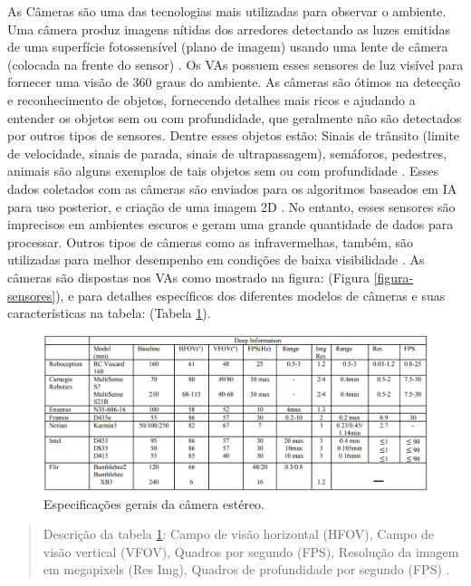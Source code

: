 As Câmeras são uma das tecnologias mais utilizadas para observar o ambiente. Uma câmera produz imagens nítidas dos arredores detectando as luzes emitidas de uma superfície fotossensível (plano de imagem) usando uma lente de câmera (colocada na frente do sensor) \cite{sensors}. Os VAs possuem esses sensores de luz visível para fornecer uma visão de 360 graus do ambiente. As câmeras são ótimos na detecção e reconhecimento de objetos, fornecendo detalhes mais ricos e ajudando a entender os objetos sem ou com profundidade, que geralmente não são detectados por outros tipos de sensores. Dentre esses objetos estão: Sinais de trânsito (limite de velocidade, sinais de parada, sinais de ultrapassagem), semáforos, pedestres, animais são alguns exemplos de tais objetos sem ou com profundidade \cite{sensors-yet}. Esses dados coletados com as câmeras são enviados para os algoritmos baseados em IA para uso posterior, e criação de uma imagem 2D \cite{aplicacao2}. 
No entanto, esses sensores são imprecisos em ambientes escuros e geram uma grande quantidade de dados para processar. Outros tipos de câmeras como as infravermelhas, também, são utilizadas para melhor desempenho em condições de baixa visibilidade \cite{review-auto}. As câmeras são dispostas nos VAs como mostrado na figura: (Figura \ref{figura-sensores}), e para detalhes específicos dos diferentes modelos de câmeras e suas características na tabela: (Tabela \ref{tabela-camera}).

\begin{figure}[H]
\centering
\includegraphics[width=\textwidth]{Figures/camera-table.png}
\caption{Especificações gerais da câmera estéreo.}
\label{tabela-camera}
\end{figure}
\begin{quote}
Descrição da tabela \ref{tabela-camera}: Campo de visão horizontal (HFOV), Campo de visão vertical (VFOV), Quadros por segundo (FPS), Resolução da imagem em megapixels (Res Img), Quadros de profundidade por segundo (FPS) \cite{sensors}.
\end{quote}

